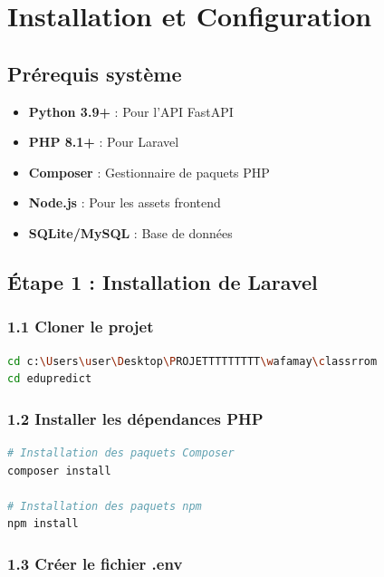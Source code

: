 \documentclass[12pt,a4paper]{article}
\begin{document}
\newpage

\section{Installation et Configuration}

\subsection{Prérequis système}

\begin{itemize}
    \item \textbf{Python 3.9+} : Pour l'API FastAPI
    \item \textbf{PHP 8.1+} : Pour Laravel
    \item \textbf{Composer} : Gestionnaire de paquets PHP
    \item \textbf{Node.js} : Pour les assets frontend
    \item \textbf{SQLite/MySQL} : Base de données
\end{itemize}

\subsection{Étape 1 : Installation de Laravel}

\subsubsection{1.1 Cloner le projet}

\begin{lstlisting}[language=bash]
cd c:\Users\user\Desktop\PROJETTTTTTTTT\wafamay\classrrom
cd edupredict
\end{lstlisting}

\subsubsection{1.2 Installer les dépendances PHP}

\begin{lstlisting}[language=bash]
# Installation des paquets Composer
composer install

# Installation des paquets npm
npm install
\end{lstlisting}

\subsubsection{1.3 Créer le fichier .env}
\end{document}
